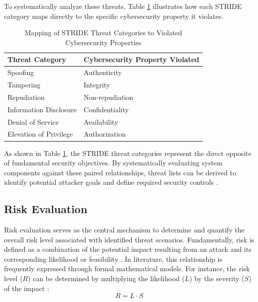 To systematically analyze these threats, Table \ref{tab:stride_mapping} illustrates how each STRIDE category maps directly to the specific cybersecurity property it violates.

\begin{table}[htbp]
	\caption{Mapping of STRIDE Threat Categories to Violated Cybersecurity Properties \cite[p. 144]{doCarmo2025} \cite{owasp_threat_modeling_process}}
	\label{tab:stride_mapping}
	\centering
	\begin{tabularx}{\textwidth}{X X}
		\toprule
		\textbf{Threat Category} & \textbf{Cybersecurity Property Violated} \\
		\midrule
		Spoofing & Authenticity \\
		Tampering & Integrity \\
		Repudiation & Non-repudiation \\
		Information Disclosure & Confidentiality \\
		Denial of Service & Availability \\
		Elevation of Privilege & Authorization \\
		\bottomrule
	\end{tabularx}
\end{table}

As shown in Table \ref{tab:stride_mapping}, the STRIDE threat categories represent the direct opposite of fundamental security objectives. By systematically evaluating system components against these paired relationships, threat lists can be derived to identify potential attacker goals and define required security controls \cite[p. 144]{doCarmo2025} \cite{owasp_threat_modeling_process}.



\subsection{Risk Evaluation} 
\label{subsec:risk_evaluation} 

Risk evaluation serves as the central mechanism to determine and quantify the overall risk level associated with identified threat scenarios. Fundamentally, risk is defined as a combination of the potential impact resulting from an attack and its corresponding likelihood or feasibility \cite[p. 196]{doCarmo2025}. In literature, this relationship is frequently expressed through formal mathematical models. For instance, the risk level ($R$) can be determined by multiplying the likelihood ($L$) by the severity ($S$) of the impact \cite[p. 648]{10.1007/978-3-030-85969-5_37}:
\begin{equation}
	R = L \cdot S
\end{equation}

